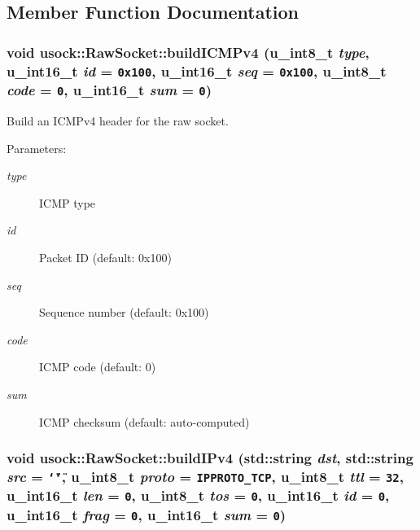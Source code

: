 \subsection{Member Function Documentation}
\hypertarget{classusock_1_1RawSocket_bf253d275f07db49c00f4b0d8fcf0947}{
\subsubsection[{buildICMPv4}]{\setlength{\rightskip}{0pt plus 5cm}void usock::RawSocket::buildICMPv4 (u\_\-int8\_\-t {\em type}, \/  u\_\-int16\_\-t {\em id} = {\tt 0x100}, \/  u\_\-int16\_\-t {\em seq} = {\tt 0x100}, \/  u\_\-int8\_\-t {\em code} = {\tt 0}, \/  u\_\-int16\_\-t {\em sum} = {\tt 0})}}
\label{classusock_1_1RawSocket_bf253d275f07db49c00f4b0d8fcf0947}


Build an ICMPv4 header for the raw socket. 

\begin{Desc}
\item[Parameters:]
\begin{description}
\item[{\em type}]ICMP type \item[{\em id}]Packet ID (default: 0x100) \item[{\em seq}]Sequence number (default: 0x100) \item[{\em code}]ICMP code (default: 0) \item[{\em sum}]ICMP checksum (default: auto-computed) \end{description}
\end{Desc}
\hypertarget{classusock_1_1RawSocket_1365484108821273f2c2e279f908df21}{
\subsubsection[{buildIPv4}]{\setlength{\rightskip}{0pt plus 5cm}void usock::RawSocket::buildIPv4 (std::string {\em dst}, \/  std::string {\em src} = {\tt \char`\"{}\char`\"{}}, \/  u\_\-int8\_\-t {\em proto} = {\tt IPPROTO\_\-TCP}, \/  u\_\-int8\_\-t {\em ttl} = {\tt 32}, \/  u\_\-int16\_\-t {\em len} = {\tt 0}, \/  u\_\-int8\_\-t {\em tos} = {\tt 0}, \/  u\_\-int16\_\-t {\em id} = {\tt 0}, \/  u\_\-int16\_\-t {\em frag} = {\tt 0}, \/  u\_\-int16\_\-t {\em sum} = {\tt 0})}}
\label{classusock_1_1RawSocket_1365484108821273f2c2e279f908df21}


